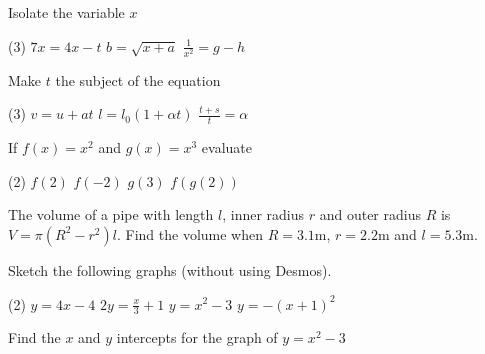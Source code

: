 \begin{Exercise}[title={Functions},label=ex12]

\Question Isolate the variable $x$
\begin{tasks}(3)
	\task 	 $7x=4x-t$%
	\task $b=\sqrt{x+a}$%
	\task   $\displaystyle \frac{1}{x^2}=g-h$%
\end{tasks}

\Question Make $t$ the subject of the equation
\begin{tasks}(3)
	\task 	 $v =u +a t$%
	\task    $l =l_{0} \left (1 +\alpha  t\right )$%
	\task    $\displaystyle\frac{t+s}{t}=\alpha$ %
\end{tasks}

\Question If $f (x) =x^{2}$ and $g (x) =x^{3}$ evaluate
\begin{tasks}(2)
	\task 	 $f (2)$%
	\task    $f ( -2)$%
	\task 	 $g (3)$%
	\task    $f(g ( 2))$%
\end{tasks}

\Question The volume of a pipe with length $l$, inner radius $r$ and outer radius $R$ is $V =\pi  \left (R^{2} -r^{2}\right ) l\text{.}$ Find the volume when $R =3.1 \mbox{m}$, $r =2.2 \mbox{m}$ and $l =5.3 \mbox{m}\text{.}$%

\Question Sketch the following graphs (without using Desmos).
\begin{tasks}(2)
	\task 	 $y=4x-4$
	\task    $2y=\frac{x}{3}+1$	
	\task 	 $y =x^{2} -3$ 
	\task    $y =-(x+1)^{2}$ 
\end{tasks}

\Question Find the $x$ and $y$ intercepts for the graph of $y =x^{2} -3$%


\end{Exercise}
